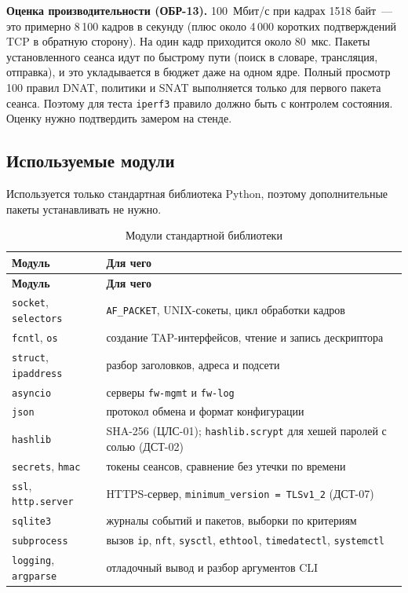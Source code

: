 \documentclass[12pt,a4paper,final]{article}
\begin{document}
\textbf{Оценка производительности (ОБР-13).} 100~Мбит/с при кадрах 1518 байт~—
это примерно 8\,100 кадров в секунду (плюс около 4\,000 коротких подтверждений
TCP в обратную сторону). На один кадр приходится около 80~мкс. Пакеты
установленного сеанса идут по быстрому пути (поиск в словаре, трансляция,
отправка), и это укладывается в бюджет даже на одном ядре. Полный просмотр
100 правил DNAT, политики и SNAT выполняется только для первого пакета сеанса.
Поэтому для теста \texttt{iperf3} правило должно быть с контролем состояния.
Оценку нужно подтвердить замером на стенде.

\subsection{Используемые модули}

Используется только стандартная библиотека Python, поэтому дополнительные
пакеты устанавливать не нужно.

{\small
\begin{longtable}{|L{4.4cm}|L{10.2cm}|}
\caption{Модули стандартной библиотеки}\label{tab:modules}\\
\hline
\textbf{Модуль} & \textbf{Для чего}\\
\hline\endfirsthead
\hline
\textbf{Модуль} & \textbf{Для чего}\\
\hline\endhead
\texttt{socket}, \texttt{selectors} & \texttt{AF\_PACKET}, UNIX-сокеты, цикл обработки кадров\\ \hline
\texttt{fcntl}, \texttt{os} & создание TAP-интерфейсов, чтение и запись дескриптора\\ \hline
\texttt{struct}, \texttt{ipaddress} & разбор заголовков, адреса и подсети\\ \hline
\texttt{asyncio} & серверы \texttt{fw-mgmt} и \texttt{fw-log}\\ \hline
\texttt{json} & протокол обмена и формат конфигурации\\ \hline
\texttt{hashlib} & SHA-256 (ЦЛС-01); \texttt{hashlib.scrypt} для хешей паролей с солью (ДСТ-02)\\ \hline
\texttt{secrets}, \texttt{hmac} & токены сеансов, сравнение без утечки по времени\\ \hline
\texttt{ssl}, \texttt{http.server} & HTTPS-сервер, \texttt{minimum\_version = TLSv1\_2} (ДСТ-07)\\ \hline
\texttt{sqlite3} & журналы событий и пакетов, выборки по критериям\\ \hline
\texttt{subprocess} & вызов \texttt{ip}, \texttt{nft}, \texttt{sysctl}, \texttt{ethtool}, \texttt{timedatectl}, \texttt{systemctl}\\ \hline
\texttt{logging}, \texttt{argparse} & отладочный вывод и разбор аргументов CLI\\ \hline
\end{longtable}
}

\end{document}
